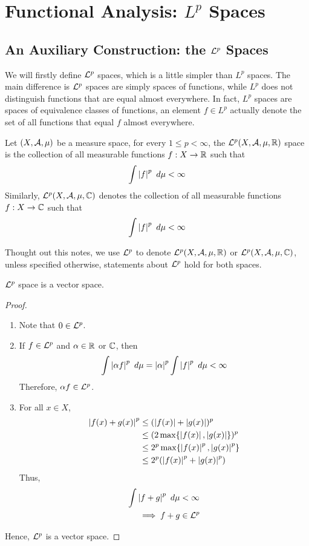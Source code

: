 \documentclass[11pt]{article}
\begin{document}
	\newpage
	\section{Functional Analysis: $L^p$ Spaces}
	\subsection{An Auxiliary Construction: the $\mathcal{{L}}^p$ Spaces}
	We will firstly define $\mathcal{{L}}^p$ spaces, which is a little simpler than $L^p$ spaces. The main difference is $\mathcal{{L}}^p$ spaces are simply spaces of functions, while $L^p$ does not distinguish functions that are equal almost everywhere. In fact, $L^p$ spaces are spaces of equivalence classes of functions, an element $f \in L^p$ actually denote the set of all functions that equal $f$ almost everywhere.
	\begin{definition}
		Let $(X, \mathcal{{A}}, \mu)$ be a measure space, for every $1 \leq p < \infty$, the $\mathcal{{L}}^p(X, \mathcal{{A}}, \mu, \mathbb{R})$ space is the collection of all measurable functions $f: X \to \mathbb{R}$ such that
		\begin{align}
			\int \left \vert {f} \right \vert^p\ d\mu < \infty
		\end{align}
		Similarly, $\mathcal{{L}}^p(X, \mathcal{{A}}, \mu, \mathbb{C})$ denotes the collection of all measurable functions $f: X \to \mathbb{C}$ such that
		\begin{align}
			\int \left \vert {f} \right \vert^p\ d\mu < \infty
		\end{align}
	\end{definition}
	Thought out this notes, we use $\mathcal{{L}}^p$ to denote $\mathcal{{L}}^p(X, \mathcal{{A}}, \mu, \mathbb{R})$ or $\mathcal{{L}}^p(X, \mathcal{{A}}, \mu, \mathbb{C})$, unless specified otherwise, statements about $\mathcal{{L}}^p$ hold for both spaces.
	\begin{proposition}
		$\mathcal{{L}}^p$ space is a vector space.
		\begin{proof} \quad
		\begin{enumerate}
		\item Note that $0 \in \mathcal{{L}}^p$.
		\item If $f \in \mathcal{{L}}^p$ and $\alpha \in \mathbb{R}$ or $\mathbb{C}$, then
		\begin{align}
			\int \abs{\alpha f}^p\ d\mu = \abs{\alpha}^p \int \abs{f}^p\ d\mu < \infty
		\end{align}
		Therefore, $\alpha f \in \mathcal{{L}}^p$.
		\item For all $x \in X$,
		\begin{align}
			\left \vert {f(x) + g(x)} \right \vert^p &\leq (\left \vert {f(x)} \right \vert + \left \vert {g(x)} \right \vert)^p \\
			&\leq (2 \max\{\left \vert {f(x)} \right \vert, \left \vert {g(x)} \right \vert\})^p \\
			&\leq 2^p \max\{\left \vert {f(x)} \right \vert^p, \left \vert {g(x)} \right \vert^p\} \\
			&\leq 2^p (\left \vert {f(x)} \right \vert^p + \left \vert {g(x)} \right \vert^p)
		\end{align}
		Thus,
		\begin{align}
		\int \left \vert {f+g} \right \vert^p\ d\mu &< \infty \\
			\implies f + g &\in \mathcal{{L}}^p
		\end{align}
		\end{enumerate}
		Hence, $\mathcal{{L}}^p$ is a vector space.
		\end{proof}
	\end{proposition}
	
\end{document}
